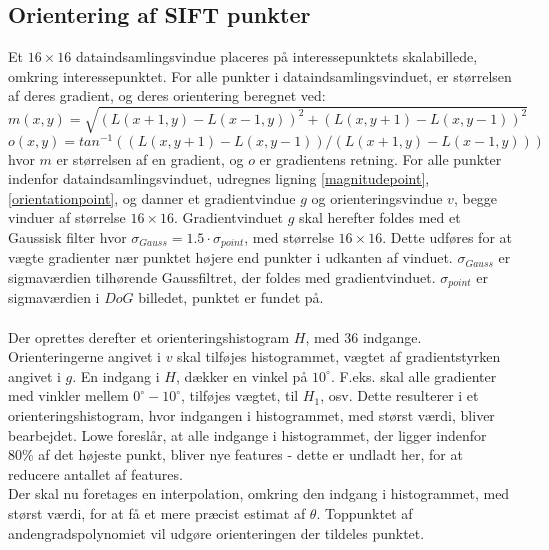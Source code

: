 \subsection{Orientering af SIFT punkter}
Et $16\times 16$ dataindsamlingsvindue placeres på interessepunktets skalabillede, omkring interessepunktet. For alle punkter i dataindsamlingsvinduet, er størrelsen af deres gradient, og deres orientering beregnet ved:
\begin{equation}
m(x,y) = \sqrt{(L(x + 1, y) - L(x - 1, y))^2 + (L(x, y + 1) - L(x, y - 1))^2} 
\label{magnitudepoint}
\end{equation}
\begin{equation}o(x,y) = tan^{-1}((L(x,y+1) - L(x,y-1))/(L(x+1, y) - L(x-1, y))) 
\label{orientationpoint}
\end{equation}
hvor $m$ er størrelsen af en gradient, og $o$ er gradientens retning. For alle punkter indenfor dataindsamlingsvinduet, udregnes ligning
\eqref{magnitudepoint}, \eqref{orientationpoint}, og danner et gradientvindue $g$ og orienteringsvindue $v$, begge vinduer af størrelse $16\times16$. Gradientvinduet $g$ skal herefter foldes med et Gaussisk filter hvor $\sigma_{Gauss} = 1.5 \cdot \sigma_{point}$, med størrelse $16\times16$. Dette udføres for at vægte gradienter nær punktet højere end punkter i udkanten af vinduet.  $\sigma_{Gauss}$ er sigmaværdien tilhørende Gaussfiltret, der foldes med gradientvinduet. $\sigma_{point}$ er sigmaværdien i $DoG$ billedet, punktet er fundet på. 
\\
\\
Der oprettes derefter et orienteringshistogram $H$, med 36 indgange. Orienteringerne angivet i $v$ skal tilføjes histogrammet, vægtet af gradientstyrken angivet i $g$. En indgang i $H$, dækker en vinkel på $10^{\circ}$. F.eks. skal alle gradienter med vinkler mellem  $0^{\circ}-10^{\circ}$, tilføjes vægtet, til $H_1$, osv. Dette resulterer i et orienteringshistogram, hvor indgangen i histogrammet, med størst værdi, bliver bearbejdet. Lowe foreslår, at alle indgange i histogrammet, der ligger indenfor 80\% af det højeste punkt, bliver nye features - dette er undladt her, for at reducere antallet af features. 
\\
Der skal nu foretages en interpolation, omkring den indgang i histogrammet, med størst værdi, for at få et mere præcist estimat af $\theta$. Toppunktet af andengradspolynomiet vil udgøre orienteringen der tildeles punktet. 

